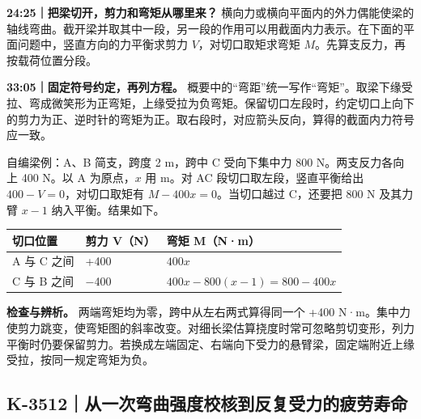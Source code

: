 \documentclass[zihao=5,a4paper,UTF8,fontset=fandol]{ctexart}
\begin{document}
\textbf{24:25｜把梁切开，剪力和弯矩从哪里来？} 横向力或横向平面内的外力偶能使梁的轴线弯曲。截开梁并取其中一段，另一段的作用可以用截面内力表示。在下面的平面问题中，竖直方向的力平衡求剪力 $V$，对切口取矩求弯矩 $M$。先算支反力，再按载荷位置分段。


\textbf{33:05｜固定符号约定，再列方程。} 概要中的“弯距”统一写作“弯矩”。取梁下缘受拉、弯成微笑形为正弯矩，上缘受拉为负弯矩。保留切口左段时，约定切口上向下的剪力为正、逆时针的弯矩为正。取右段时，对应箭头反向，算得的截面内力符号应一致。


自编梁例：A、B 简支，跨度 2 m，跨中 C 受向下集中力 800 N。两支反力各向上 400 N。以 A 为原点，$x$ 用 m。对 AC 段切口取左段，竖直平衡给出 $400-V=0$，对切口取矩有 $M-400x=0$。当切口越过 C，还要把 800 N 及其力臂 $x-1$ 纳入平衡。结果如下。


\begin{longtable}{p{4.86cm}p{4.86cm}p{4.86cm}}
\toprule
切口位置 & 剪力 V（N） & 弯矩 M（N·m） \\

\midrule
\endhead
A 与 C 之间 & +400 & $400x$ \\
C 与 B 之间 & $-$400 & $400x-800(x-1)=800-400x$ \\
\bottomrule
\end{longtable}

\begin{center}
\end{center}


\textbf{检查与辨析。} 两端弯矩均为零，跨中从左右两式算得同一个 +400 N·m。集中力使剪力跳变，使弯矩图的斜率改变。对细长梁估算挠度时常可忽略剪切变形，列力平衡时仍要保留剪力。若换成左端固定、右端向下受力的悬臂梁，固定端附近上缘受拉，按同一规定弯矩为负。





\subsection{K-3512｜从一次弯曲强度校核到反复受力的疲劳寿命}
\label{k-3512}
\end{document}
